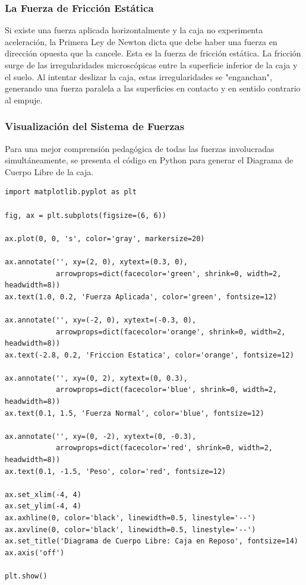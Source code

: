 \documentclass[12pt]{article}
\begin{document}
\subsubsection*{La Fuerza de Fricción Estática}
Si existe una fuerza aplicada horizontalmente y la caja no experimenta aceleración, la Primera Ley de Newton dicta que debe haber una fuerza en dirección opuesta que la cancele. Esta es la fuerza de fricción estática. La fricción surge de las irregularidades microscópicas entre la superficie inferior de la caja y el suelo. Al intentar deslizar la caja, estas irregularidades se "enganchan", generando una fuerza paralela a las superficies en contacto y en sentido contrario al empuje.

\subsubsection*{Visualización del Sistema de Fuerzas}
Para una mejor comprensión pedagógica de todas las fuerzas involucradas simultáneamente, se presenta el código en Python para generar el Diagrama de Cuerpo Libre de la caja.

\begin{lstlisting}
import matplotlib.pyplot as plt

fig, ax = plt.subplots(figsize=(6, 6))

ax.plot(0, 0, 's', color='gray', markersize=20)

ax.annotate('', xy=(2, 0), xytext=(0.3, 0), 
            arrowprops=dict(facecolor='green', shrink=0, width=2, headwidth=8))
ax.text(1.0, 0.2, 'Fuerza Aplicada', color='green', fontsize=12)

ax.annotate('', xy=(-2, 0), xytext=(-0.3, 0), 
            arrowprops=dict(facecolor='orange', shrink=0, width=2, headwidth=8))
ax.text(-2.8, 0.2, 'Friccion Estatica', color='orange', fontsize=12)

ax.annotate('', xy=(0, 2), xytext=(0, 0.3), 
            arrowprops=dict(facecolor='blue', shrink=0, width=2, headwidth=8))
ax.text(0.1, 1.5, 'Fuerza Normal', color='blue', fontsize=12)

ax.annotate('', xy=(0, -2), xytext=(0, -0.3), 
            arrowprops=dict(facecolor='red', shrink=0, width=2, headwidth=8))
ax.text(0.1, -1.5, 'Peso', color='red', fontsize=12)

ax.set_xlim(-4, 4)
ax.set_ylim(-4, 4)
ax.axhline(0, color='black', linewidth=0.5, linestyle='--')
ax.axvline(0, color='black', linewidth=0.5, linestyle='--')
ax.set_title('Diagrama de Cuerpo Libre: Caja en Reposo', fontsize=14)
ax.axis('off')

plt.show()
\end{lstlisting}
\end{document}
